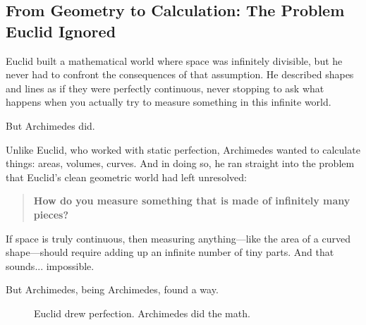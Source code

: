 \subsection{From Geometry to Calculation: The Problem Euclid Ignored}

Euclid built a mathematical world where space was infinitely divisible, but he never had to confront the consequences of that assumption. He described shapes and lines as if they were perfectly continuous, never stopping to ask what happens when you actually try to measure something in this infinite world.  

But Archimedes did.  

Unlike Euclid, who worked with static perfection, Archimedes wanted to calculate things: areas, volumes, curves. And in doing so, he ran straight into the problem that Euclid’s clean geometric world had left unresolved:  

\begin{quote}
    \textbf{How do you measure something that is made of infinitely many pieces?}
\end{quote}

If space is truly continuous, then measuring anything—like the area of a curved shape—should require adding up an infinite number of tiny parts. And that sounds... impossible.  

But Archimedes, being Archimedes, found a way.




\begin{figure}[H]
\centering
{}
\caption{Euclid drew perfection. Archimedes did the math.}
\end{figure}
